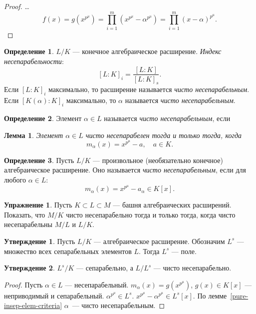 \documentclass[12pt]{article}%
\newtheorem{Lemma}{Лемма}[section]
\theoremstyle{remark}
\theoremstyle{definition}
\newtheorem{Exec}{Упражнение}
\newtheorem{Prop}{Утверждение}
\newtheorem{Def}{Определение}[section]
\begin{document}
\begin{proof}
\ldots
\[
    f(x) = g(x^{p^\mu}) = \prod_{i=1}^m (x^{p^\mu} - \alpha^{p^\mu})
     = \prod_{i=1}^m (x - \alpha)^{p^\mu}.
\]
\end{proof}

\begin{Def} 
$L/K$ — конечное алгебраическое расширение. \emph{Индекс несепарабельности}:
\[
    [L : K]_i = \frac {[L:K]} {[L:K]_s}.
\] 
Если $[L:K]_i$ максимально, то расширение называется \emph{чисто
несепарабельным}. Если $[K(\alpha):K]_i$ максимально, то $\alpha$ называется
\emph{чисто несепарабельным}. 
\end{Def}

\begin{Def}
Элемент $\alpha \in L$ называется \emph{чисто несепарабельным}, если
\end{Def}

\begin{Lemma}\label{pure-insep-elem-criteria}
Элемент $\alpha\in L$ чисто несепарабелен тогда и только тогда, когда
\[
    m_\alpha(x) = x^{p^\mu} - a, \quad a \in K.
\]
\end{Lemma}

\begin{Def}
Пусть $L/K$ — произвольное (необязательно конечное) алгебраическое расширение.
Оно называется \emph{чисто несепарабельным}, если для любого $\alpha \in L$:
\[
    m_\alpha(x) = x^{p^\mu} - a_\alpha \in K[x].
\]
\end{Def}

\begin{Exec}
Пусть $K \subset L \subset M$ — башня алгебраических расширений. Показать, что
$M/K$ чисто несепарабельно тогда и только тогда, когда чисто несепарабельны
$M/L$ и $L/K$.
\end{Exec}

\begin{Prop}
Пусть $L/K$ — алгебраическое расширение. Обозначим $L^s$ — множество всех
сепарабельных элементов $L$. Тогда $L^s$ — поле.
\end{Prop}

\begin{Prop}
$L^s/K$ — сепарабельно, а $L/ L^s$ — чисто несепарабельно.
\end{Prop}

\begin{proof}
Пусть $\alpha \in L$ — несепарабельный. $m_\alpha(x) = g(x^{p^\mu})$, $g(x) \in
K[x]$ — неприводимый и сепарабельный. $\alpha^{p^\mu} \in L^s$. $x^{p^\mu} -
\alpha^{p^\mu} \in L^s[x]$. По лемме~\eqref{pure-insep-elem-criteria} $\alpha$~—
чисто несепарабельным.
\end{proof}
\end{document}
